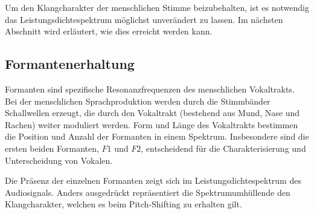 Um den Klangcharakter der menschlichen Stimme beizubehalten,
ist es notwendig das Leistungsdichtespektrum möglichst unverändert zu lassen.
Im nächsten Abschnitt wird erläutert, wie dies erreicht werden kann.


\subsection{Formantenerhaltung
\label{autotune:subsection:formantenErhaltung}}
Formanten sind spezifische Resonanzfrequenzen des menschlichen Vokaltrakts.
%
%
Bei der menschlichen Sprachproduktion werden durch die Stimmbänder Schallwellen erzeugt,
die durch den Vokaltrakt (bestehend aus Mund, Nase und Rachen) weiter moduliert werden.
Form und Länge des Vokaltrakts bestimmen die Position und Anzahl der Formanten in einem Spektrum. 
Insbesondere sind die ersten beiden Formanten, $F1$ und $F2$,
entscheidend für die Charakterisierung und Unterscheidung von Vokalen.

Die Präsenz der einzelnen Formanten zeigt sich im Leistungsdichtespektrum des Audiosignals.
Anders ausgedrückt repräsentiert die Spektrumumhüllende den Klangcharakter, welchen es beim Pitch-Shifting zu erhalten gilt.

